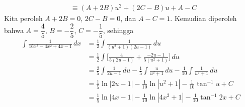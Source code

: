 \documentclass{article}
\begin{document}
\begin{enumerate}
\begin{align*}
	&\equiv (A+2B)u^2+(2C-B)u+A-C
	\end{align*}
	Kita peroleh $A+2B=0$, $2C-B=0$, dan $A-C=1$. Kemudian diperoleh bahwa $A=\dfrac{4}{5}$, $B=-\dfrac{2}{5}$, $C=-\dfrac{1}{5}$, sehingga
	\begin{align*}
	\int \frac{1}{16x^3-4x^2+4x-1} \, dx &= \frac{1}{2} \int \frac{1}{(u^2+1)(2u-1)} \, du \\
	&= \frac{1}{2} \int \bigg[\frac{4}{5(2u-1)} + \frac{-2u-1}{5(u^2+1)}\bigg] \, du \\
	&= \frac{2}{5} \int \frac{1}{2u-1} \, du - \frac{1}{5}\int \frac{u}{u^2+1} \, du - \frac{1}{10} \int \frac{1}{u^2+1} \, du   \\
	&= \frac{1}{5} \ln|2u-1| -\frac{1}{10}\ln|u^2+1|-\frac{1}{10}\tan^{-1}u + C \\
	&= \frac{1}{5} \ln|4x-1| -\frac{1}{10}\ln|4x^2+1|-\frac{1}{10}\tan^{-1}2x + C \\
	\end{align*}
\end{enumerate}
\newpage
\end{document}
